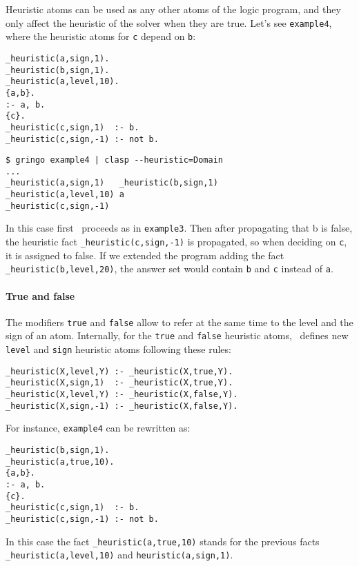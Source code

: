 Heuristic atoms can be used as any other atoms of the logic program, 
and they only affect the heuristic of the solver when they are true. 
Let's see \texttt{example4}, where the heuristic atoms for \texttt{c} depend on \texttt{b}: 
\begin{verbatim}
_heuristic(a,sign,1).
_heuristic(b,sign,1).
_heuristic(a,level,10).
{a,b}.
:- a, b.
{c}.
_heuristic(c,sign,1)  :- b.
_heuristic(c,sign,-1) :- not b.
\end{verbatim}
\begin{verbatim}
$ gringo example4 | clasp --heuristic=Domain                                                                                  
...
_heuristic(a,sign,1)   _heuristic(b,sign,1) 
_heuristic(a,level,10) a
_heuristic(c,sign,-1)\end{verbatim}

In this case first \clasp\ proceeds as in \texttt{example3}.  
Then after propagating that b is false,  the heuristic fact \texttt{\_heuristic(c,sign,-1)} is propagated, 
so when deciding on \texttt{c}, it is assigned to false.  If we extended the program adding the fact \texttt{\_heuristic(b,level,20)}, 
the answer set would contain \texttt{b} and \texttt{c} instead of \texttt{a}.  

\paragraph{True and false}

 The modifiers \texttt{true} and \texttt{false} allow to refer at the same time to the level and the sign of an atom. 
 Internally,  for the \texttt{true} and \texttt{false} heuristic atoms, 
 \clasp\ defines new \texttt{level} and \texttt{sign} heuristic atoms following these rules: 
\begin{verbatim}
_heuristic(X,level,Y) :- _heuristic(X,true,Y).
_heuristic(X,sign,1)  :- _heuristic(X,true,Y).
_heuristic(X,level,Y) :- _heuristic(X,false,Y).
_heuristic(X,sign,-1) :- _heuristic(X,false,Y).
\end{verbatim}

For instance, \texttt{example4} can be rewritten as: 
\begin{verbatim}
_heuristic(b,sign,1).
_heuristic(a,true,10).
{a,b}.
:- a, b.
{c}.
_heuristic(c,sign,1)  :- b.
_heuristic(c,sign,-1) :- not b.
\end{verbatim}

In this case the fact \texttt{\_heuristic(a,true,10)} stands for the previous 
facts \texttt{\_heuristic(a,level,10)} and \texttt{heuristic(a,sign,1)}. 


